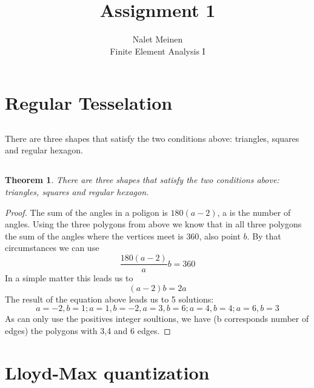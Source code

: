 \documentclass[12pt]{article}
\begin{document}


\title{Assignment 1}%
\author{Nalet Meinen\\ %
Finite Element Analysis I
}

\maketitle

\section{Regular Tesselation}
\subsection{}
  There are three shapes that satisfy the two conditions above: triangles, squares and regular hexagon.
\subsection{}
\newtheorem{thm}{Theorem}
\begin{thm}
  There are three shapes that satisfy the two conditions above: triangles, squares and regular hexagon.
\end{thm}

\begin{proof}
The sum of the angles in a poligon is $180(a-2)$, a is the number of angles. 
Using the three polygons from above we know that in all three polygons the sum of the angles 
where the vertices meet is $360$, also point $b$. By that circumstances we can use
\[ \frac{180(a-2)}{a}b=360 \]
In a simple matter this leads us to
\[ (a-2)b=2a \]
The result of the equation above leads us to 5 solutions: 
\[ a=-2,b=1;a=1,b=-2,a=3,b=6;a=4,b=4;a=6,b=3 \]
As can only use the positives integer soultions, we have (b corresponds number of edges) the polygons
with 3,4 and 6 edges.
\end{proof}
\newpage

\section{Lloyd-Max quantization}
\end{document}
